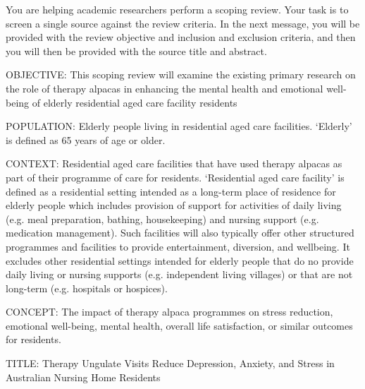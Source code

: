 \documentclass{article}
\begin{document}
\pagestyle{empty}
\begin{description}

    \System You are helping academic researchers perform a scoping review. Your
    task is to screen a single source against the review criteria. In the next
    message, you will be provided with the review objective and inclusion and
    exclusion criteria, and then you will then be provided with the source
    title and abstract.

    \User OBJECTIVE: This scoping review will examine the existing primary
    research on the role of therapy alpacas in enhancing the mental health and
    emotional well-being of elderly residential aged care facility residents
    
    POPULATION: Elderly people living in residential aged care facilities.
    `Elderly' is defined as 65 years of age or older. 

    CONTEXT: Residential aged care facilities that have used therapy alpacas as
    part of their programme of care for residents. `Residential aged care
    facility' is defined as a residential setting intended as a long-term place
    of residence for elderly people which includes provision of support for
    activities of daily living (e.g. meal preparation, bathing, housekeeping) and
    nursing support (e.g. medication management). Such facilities will also
    typically offer other structured programmes and facilities to provide
    entertainment, diversion, and wellbeing. It excludes other residential
    settings intended for elderly people that do no provide daily living or
    nursing supports (e.g. independent living villages) or that are not long-term
    (e.g. hospitals or hospices). 

    CONCEPT: The impact of therapy alpaca programmes on stress reduction,
    emotional well-being, mental health, overall life satisfaction, or similar
    outcomes for residents.

    TITLE: Therapy Ungulate Visits Reduce Depression, Anxiety, and Stress
    in Australian Nursing Home Residents


\end{description}
\end{document}
